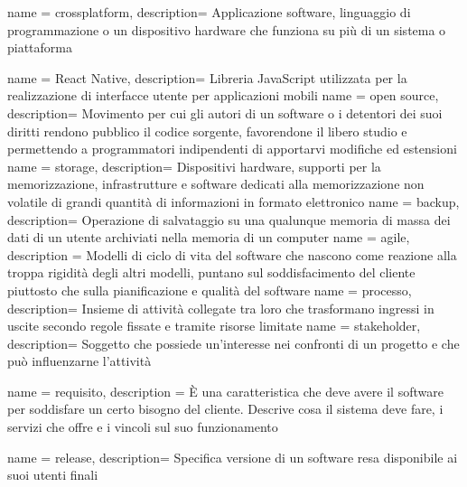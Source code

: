 
 {
  name = crossplatform,
  description={
		Applicazione software, linguaggio di programmazione o un dispositivo hardware che funziona su più di un sistema o piattaforma}
}

 {
  name = React Native,
  description={
		Libreria JavaScript utilizzata per la realizzazione di interfacce utente per applicazioni mobili}
}
 {
  name = open source,
  description={
		Movimento per cui gli autori di un software o i detentori dei suoi diritti rendono pubblico il codice sorgente, favorendone il libero studio e permettendo a programmatori indipendenti di apportarvi modifiche ed estensioni}
}
 {
  name = storage,
  description={
		Dispositivi hardware, supporti per la memorizzazione, infrastrutture e software dedicati alla memorizzazione non volatile di grandi quantità di informazioni in formato elettronico}
}
 {
  name = backup,
  description={
		Operazione di salvataggio su una qualunque memoria di massa dei dati di un utente archiviati nella memoria di un computer}
}
 {
  name = agile,
  description = {
		Modelli di ciclo di vita del software che nascono come reazione alla troppa rigidità degli altri modelli, puntano sul soddisfacimento del cliente piuttosto che sulla pianificazione e qualità del software}
}
 {
  name = processo,
  description={
		Insieme di attività collegate tra loro che trasformano ingressi in uscite secondo regole fissate e tramite risorse limitate}
}
 {
  name = stakeholder,
  description={
  		Soggetto che possiede un'interesse nei confronti di un progetto e che può influenzarne l'attività}
}

 {
  name = requisito,
  description = {
		È una caratteristica che deve avere il software per soddisfare un certo bisogno del cliente. Descrive cosa il sistema deve fare, i servizi che offre e i vincoli sul suo funzionamento}
}

 {
  name = release,
  description={
		Specifica versione di un software resa disponibile ai suoi utenti finali}
}


